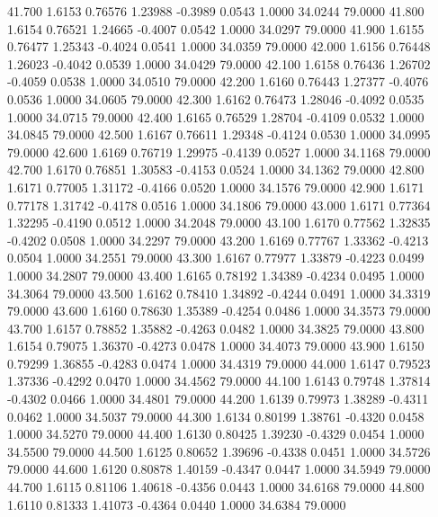  41.700   1.6153   0.76576   1.23988  -0.3989   0.0543   1.0000  34.0244  79.0000
  41.800   1.6154   0.76521   1.24665  -0.4007   0.0542   1.0000  34.0297  79.0000
  41.900   1.6155   0.76477   1.25343  -0.4024   0.0541   1.0000  34.0359  79.0000
  42.000   1.6156   0.76448   1.26023  -0.4042   0.0539   1.0000  34.0429  79.0000
  42.100   1.6158   0.76436   1.26702  -0.4059   0.0538   1.0000  34.0510  79.0000
  42.200   1.6160   0.76443   1.27377  -0.4076   0.0536   1.0000  34.0605  79.0000
  42.300   1.6162   0.76473   1.28046  -0.4092   0.0535   1.0000  34.0715  79.0000
  42.400   1.6165   0.76529   1.28704  -0.4109   0.0532   1.0000  34.0845  79.0000
  42.500   1.6167   0.76611   1.29348  -0.4124   0.0530   1.0000  34.0995  79.0000
  42.600   1.6169   0.76719   1.29975  -0.4139   0.0527   1.0000  34.1168  79.0000
  42.700   1.6170   0.76851   1.30583  -0.4153   0.0524   1.0000  34.1362  79.0000
  42.800   1.6171   0.77005   1.31172  -0.4166   0.0520   1.0000  34.1576  79.0000
  42.900   1.6171   0.77178   1.31742  -0.4178   0.0516   1.0000  34.1806  79.0000
  43.000   1.6171   0.77364   1.32295  -0.4190   0.0512   1.0000  34.2048  79.0000
  43.100   1.6170   0.77562   1.32835  -0.4202   0.0508   1.0000  34.2297  79.0000
  43.200   1.6169   0.77767   1.33362  -0.4213   0.0504   1.0000  34.2551  79.0000
  43.300   1.6167   0.77977   1.33879  -0.4223   0.0499   1.0000  34.2807  79.0000
  43.400   1.6165   0.78192   1.34389  -0.4234   0.0495   1.0000  34.3064  79.0000
  43.500   1.6162   0.78410   1.34892  -0.4244   0.0491   1.0000  34.3319  79.0000
  43.600   1.6160   0.78630   1.35389  -0.4254   0.0486   1.0000  34.3573  79.0000
  43.700   1.6157   0.78852   1.35882  -0.4263   0.0482   1.0000  34.3825  79.0000
  43.800   1.6154   0.79075   1.36370  -0.4273   0.0478   1.0000  34.4073  79.0000
  43.900   1.6150   0.79299   1.36855  -0.4283   0.0474   1.0000  34.4319  79.0000
  44.000   1.6147   0.79523   1.37336  -0.4292   0.0470   1.0000  34.4562  79.0000
  44.100   1.6143   0.79748   1.37814  -0.4302   0.0466   1.0000  34.4801  79.0000
  44.200   1.6139   0.79973   1.38289  -0.4311   0.0462   1.0000  34.5037  79.0000
  44.300   1.6134   0.80199   1.38761  -0.4320   0.0458   1.0000  34.5270  79.0000
  44.400   1.6130   0.80425   1.39230  -0.4329   0.0454   1.0000  34.5500  79.0000
  44.500   1.6125   0.80652   1.39696  -0.4338   0.0451   1.0000  34.5726  79.0000
  44.600   1.6120   0.80878   1.40159  -0.4347   0.0447   1.0000  34.5949  79.0000
  44.700   1.6115   0.81106   1.40618  -0.4356   0.0443   1.0000  34.6168  79.0000
  44.800   1.6110   0.81333   1.41073  -0.4364   0.0440   1.0000  34.6384  79.0000
